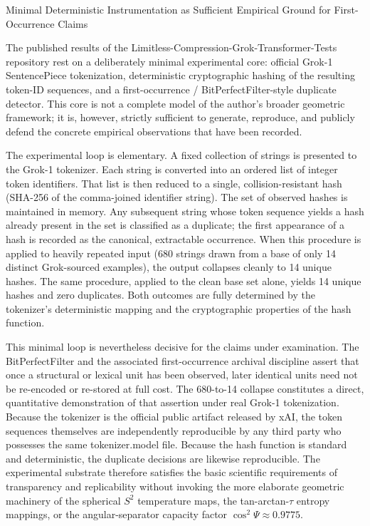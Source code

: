 Minimal Deterministic Instrumentation as Sufficient Empirical Ground for First-Occurrence Claims

The published results of the Limitless-Compression-Grok-Transformer-Tests repository rest on a deliberately minimal experimental core: official Grok-1 SentencePiece tokenization, deterministic cryptographic hashing of the resulting token-ID sequences, and a first-occurrence / BitPerfectFilter-style duplicate detector. This core is not a complete model of the author’s broader geometric framework; it is, however, strictly sufficient to generate, reproduce, and publicly defend the concrete empirical observations that have been recorded.

The experimental loop is elementary. A fixed collection of strings is presented to the Grok-1 tokenizer. Each string is converted into an ordered list of integer token identifiers. That list is then reduced to a single, collision-resistant hash (SHA-256 of the comma-joined identifier string). The set of observed hashes is maintained in memory. Any subsequent string whose token sequence yields a hash already present in the set is classified as a duplicate; the first appearance of a hash is recorded as the canonical, extractable occurrence. When this procedure is applied to heavily repeated input (680 strings drawn from a base of only 14 distinct Grok-sourced examples), the output collapses cleanly to 14 unique hashes. The same procedure, applied to the clean base set alone, yields 14 unique hashes and zero duplicates. Both outcomes are fully determined by the tokenizer’s deterministic mapping and the cryptographic properties of the hash function.

This minimal loop is nevertheless decisive for the claims under examination. The BitPerfectFilter and the associated first-occurrence archival discipline assert that once a structural or lexical unit has been observed, later identical units need not be re-encoded or re-stored at full cost. The 680-to-14 collapse constitutes a direct, quantitative demonstration of that assertion under real Grok-1 tokenization. Because the tokenizer is the official public artifact released by xAI, the token sequences themselves are independently reproducible by any third party who possesses the same tokenizer.model file. Because the hash function is standard and deterministic, the duplicate decisions are likewise reproducible. The experimental substrate therefore satisfies the basic scientific requirements of transparency and replicability without invoking the more elaborate geometric machinery of the spherical \(S^2\) temperature maps, the tan-arctan-\(\tau\) entropy mappings, or the angular-separator capacity factor \(\cos^2\Psi \approx 0.9775\).


